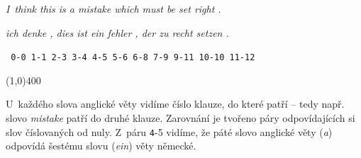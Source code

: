 \documentclass[12pt,a4paper]{report}
\begin{document}
\textit{\color{blue} 
I~think this is a mistake which must be set right .}

\textit{\color{red}
ich denke , dies ist ein fehler , der zu recht setzen .}

\texttt{{\color{blue} 0}-{\color{red}0} {\color{blue}1}-{\color{red}1} {\color{blue}2}-{\color{red}3} {\color{blue}3}-{\color{red}4} {\color{blue}4}-{\color{red}5} {\color{blue}5}-{\color{red}6} {\color{blue}6}-{\color{red}8} {\color{blue}7}-{\color{red}9} {\color{blue}9}-{\color{red}11} {\color{blue}10}-{\color{red}10} {\color{blue}11}-{\color{red}12}}

\line(1,0){400}

U~každého slova anglické věty vidíme číslo klauze, do které patří -- tedy např. slovo \textit{\color{blue}mistake} patří do druhé klauze. Zarovnání je tvořeno páry odpovídajících si slov číslovaných od nuly. Z~páru \texttt{\color{blue}4}-{\color{red}5} vidíme, že páté slovo anglické věty (\textit{\color{blue}a}) odpovídá šestému slovu (\textit{\color{red}ein}) věty německé.



\end{document}
